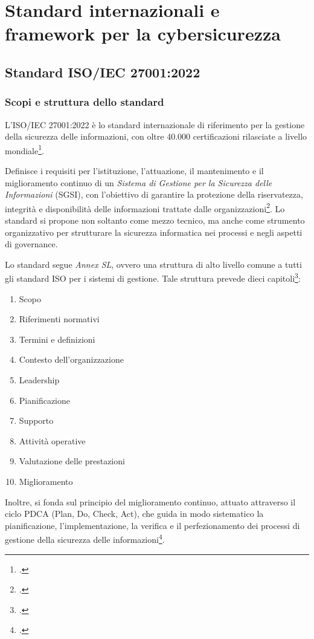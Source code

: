 \chapter{Standard internazionali e framework per la cybersicurezza}
\label{cap:standard}

\section{Standard ISO/IEC 27001:2022}

\subsection{Scopi e struttura dello standard}
L’ISO/IEC 27001:2022 è lo standard internazionale di riferimento per la gestione della sicurezza delle informazioni,
con oltre 40.000 certificazioni rilasciate a livello mondiale\footcite[p. 2]{mcintosh}.

Definisce i requisiti per l’istituzione, l’attuazione, il mantenimento e il miglioramento continuo di un 
\textit{Sistema di Gestione per la Sicurezza delle Informazioni} (SGSI), con l’obiettivo di garantire la protezione della riservatezza, 
integrità e disponibilità delle informazioni trattate dalle organizzazioni\footcite[pp. iv--v]{iso27001}. 
Lo standard si propone non soltanto come mezzo tecnico, ma anche come strumento organizzativo per strutturare la sicurezza 
informatica nei processi e negli aspetti di governance.

Lo standard segue \textit{Annex SL}, ovvero una struttura di alto livello comune a tutti gli standard ISO per i sistemi di gestione.
Tale struttura prevede dieci capitoli\footcite{uni-harmonized-structure}: 
\begin{enumerate}
    \item Scopo
    \item Riferimenti normativi
    \item Termini e definizioni
    \item Contesto dell'organizzazione
    \item Leadership
    \item Pianificazione
    \item Supporto
    \item Attività operative
    \item Valutazione delle prestazioni
    \item Miglioramento
\end{enumerate}
Inoltre, si fonda sul principio del miglioramento continuo, attuato attraverso il ciclo PDCA 
(Plan, Do, Check, Act), che guida in modo sistematico la pianificazione, l’implementazione, 
la verifica e il perfezionamento dei processi di gestione della sicurezza delle informazioni\footcite[p. 17]{watkins-iso}.

